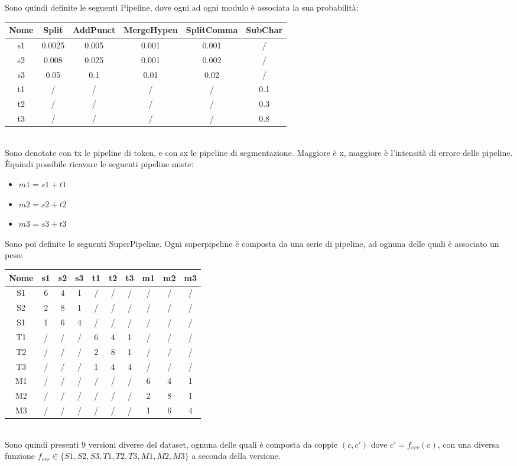 \documentclass[12pt]{article}
\newcommand{\E}{È}
\begin{document}
Sono quindi definite le seguenti Pipeline, dove ogni ad ogni modulo è associata la sua probabilità:
\begin{table}[h!]
\centering
\begin{tabular}{cccccc}
\textbf{Nome} & \textbf{Split} & \textbf{AddPunct} & \textbf{MergeHypen} & \textbf{SplitComma} & \textbf{SubChar} \\
\hline
s1 	& 0.0025 	& 0.005 	& 0.001 	& 0.001 	& / 		\\	
s2 	& 0.008 		& 0.025 	& 0.001 	& 0.002 	& /		\\
s3 	& 0.05 		& 0.1 	& 0.01 	& 0.02 	& / 		\\ \hline
t1 	& /			& /		& /		& /		& 0.1	\\
t2 	& /			& /		& /		& /		& 0.3	\\
t3 	& /			& /		& /		& /		& 0.8	\\
\end{tabular}
\end{table}
\\
Sono denotate con tx le pipeline di token, e con sx le pipeline di segmentazione. Maggiore è x, maggiore è l'intensità di errore delle pipeline.\\
\E quindi possibile ricavare le seguenti pipeline miste:
\begin{itemize}
\item $m1 = s1 + t1$
\item $m2 = s2 + t2$
\item $m3 = s3 + t3$
\end{itemize}


Sono poi definite le seguenti SuperPipeline. Ogni superpipeline è composta da una serie di pipeline, ad ognuna delle quali è associato un peso:
\begin{table}[h!]
\centering
\begin{tabular}{cccccccccc}
\textbf{Nome} & \textbf{s1} & \textbf{s2} & \textbf{s3} & \textbf{t1} & \textbf{t2} & \textbf{t3} & \textbf{m1} & \textbf{m2} & \textbf{m3}\\
\hline
S1	& 6	& 4	& 1	& /	& /	& / & / & / & / \\ 
S2	& 2	& 8	& 1	& /	& /	& / & / & / & / \\ 
S1	& 1	& 6	& 4	& /	& /	& / & / & / & / \\  \hline
T1	& /	& /	& /	& 6	& 4	& 1 & / & / & / \\ 
T2	& /	& /	& /	& 2	& 8	& 1 & / & / & / \\  
T3	& /	& /	& /	& 1	& 4	& 4 & / & / & / \\   \hline
M1	& /	& /	& /	& /	& /	& / & 6 & 4 & 1 \\ 
M2	& /	& /	& /	& /	& /	& / & 2 & 8 & 1 \\  
M3	& /	& /	& /	& /	& /	& / & 1 & 6 & 4 \\ 
\end{tabular}
\end{table}
\\
Sono quindi presenti 9 versioni diverse del dataset, ognuna delle quali è composta da coppie $(c,c')$ dove  
$c' = f_{err}(c)$, con una diversa funzione $f_{err} \in \{ S1,S2,S3,T1,T2,T3,M1,M2,M3 \} $ a seconda della versione.
\end{document}
